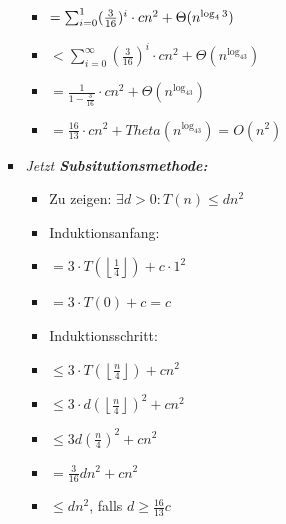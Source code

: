 \documentclass[
    12pt,
    a4paper,
    ngerman,
    color=3b,%
    marginpar=false,
    colorback=false,
    leqno,
]{tudaexercise}
\begin{document}
\begin{itemize}
\begin{itemize}
\begin{itemize}
\begin{itemize}
                                  \item[] {}  $= \sum^{\-1}_{i=0} (\frac{3}{16})^i \cdot cn^2 + \Theta(n^{\log_43})$
                                  \item[] {\makebox[0.73cm][l]{}} $< \sum^{\infty}_{i=0} (\frac{3}{16})^i \cdot cn^2 + \Theta(n^{\log_43})$
                                  \item[] {\makebox[0.75cm][l]{}} $= \frac{1}{1-\frac{3}{16}} \cdot cn^2 + \Theta(n^{\log_43})$
                                  \item[] {\makebox[0.75cm][l]{}} $ = \frac{16}{13} \cdot cn^2 + Theta(n^{\log_43}) = O(n^2)$
                              \end{itemize}
                        \item \textit{Jetzt \textbf{Subsitutionsmethode:}}
                              \begin{itemize}
                                  \item Zu zeigen: $\exists d > 0: T(n) \leq dn^2$
                                  \item Induktionsanfang:
                                  \item[] {} $= 3 \cdot T(\left \lfloor \frac{1}{4} \right \rfloor) + c \cdot 1^2$
                                  \item[] {\makebox[0.75cm][l]{}} $= 3 \cdot T(0) + c = c$
                                  \item Induktionsschritt:
                                  \item[] {} $\leq 3 \cdot T(\left \lfloor \frac{n}{4} \right \rfloor) + cn^2$
                                  \item[] {\makebox[0.75cm][l]{}} $\leq 3 \cdot d(\left \lfloor \frac{n}{4} \right \rfloor)^2+cn^2$
                                  \item[] {\makebox[0.75cm][l]{}} $\leq 3d(\frac{n}{4})^2 + cn^2$
                                  \item[] {\makebox[0.75cm][l]{}} $= \frac{3}{16}dn^2+cn^2$
                                  \item[] {\makebox[0.75cm][l]{}} $\leq dn^2$, falls $d \geq \frac{16}{13}c$
                              \end{itemize}

                    \end{itemize}
          \end{itemize}


\end{itemize}
\end{document}
